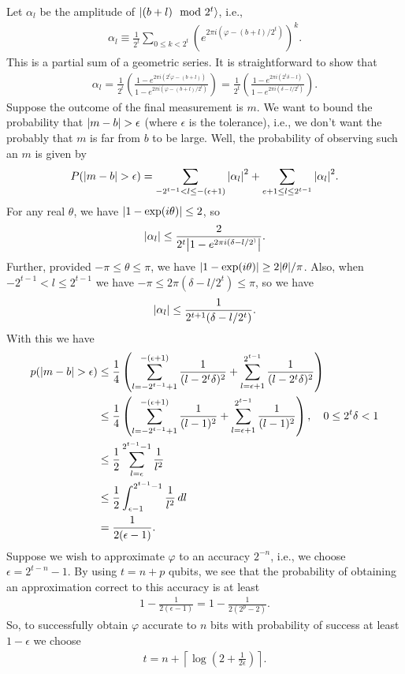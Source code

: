 \documentclass{book}
\theoremstyle{definition}
\newcommand{\nn}{\nonumber}
\newcommand{\al}{\alpha}
\newcommand{\f}[2]{\frac{#1}{#2}}
\newcommand{\lp}{\left(}
\newcommand{\rp}{\right)}
\begin{document}
Let $\al_l$ be the amplitude of $\ket{(b+l) \mod 2^t}$, i.e., 
\begin{align}
\alpha_l \equiv \f{1}{2^t}\sum_{0 \leq k < 2^t} \lp e^{2\pi i (\varphi - (b+l)/2^t)} \rp^k.
\end{align}
This is a partial sum of a geometric series. It is straightforward to show that
\begin{align}
\alpha_l = \f{1}{2^t}\lp \f{1 - e^{2\pi i (2^t \varphi - (b+l))}}{1 - e^{2\pi i (\varphi - (b+l)/2^t)}} \rp = \f{1}{2^t}\lp \f{1 - e^{2\pi i (2^t \delta - l)}}{1 - e^{2\pi i (\delta - l/2^t)}} \rp.
\end{align}
Suppose the outcome of the final measurement is $m$. We want to bound the probability that $\abs{m-b} > \epsilon$ (where $\epsilon$ is the tolerance), i.e., we don't want the probably that $m$ is far from $b$ to be large. Well, the probability of observing such an $m$ is given by
\begin{align}
P(\abs{m-b} > \epsilon) = \sum_{-2^{t-1} < l \leq -(\epsilon+1)} \abs{\al_l}^2 + \sum_{e+1 \leq l \leq 2^{t-1}}\abs{\al_l}^2.
\end{align}
For any real $\theta$, we have $\abs{1 - \exp(i\theta)} \leq 2$, so 
\begin{align}
\abs{\al_l} \leq \f{2}{2^t \abs{1 - e^{2\pi i (\delta - l/2^)}}}.
\end{align}
Further, provided $-\pi \leq \theta \leq \pi$, we have $\abs{1 - \exp(i\theta)} \geq 2\abs{\theta}/\pi$. Also, when $-2^{t-1} < l \leq 2^{t-1}$ we have $-\pi \leq 2\pi (\delta - l/2^t) \leq \pi$, so we have
\begin{align}
\abs{\al_l} \leq \f{1}{2^{t+1}(\delta - l/2^t)}.
\end{align}
With this we have
\begin{align}
p(\abs{m-b} > \epsilon) &\leq \f{1}{4}\lp \sum_{l = -2^{t-1}+1}^{-(\epsilon+1)} \f{1}{(l - 2^t \delta)^2} + \sum^{2^{t-1}}_{l = \epsilon+1} \f{1}{(l - 2^t \delta)^2}  \rp\nn\\
&\leq \f{1}{4}\lp \sum_{l = -2^{t-1}+1}^{-(\epsilon+1)} \f{1}{(l - 1)^2} + \sum^{2^{t-1}}_{l = \epsilon+1} \f{1}{(l - 1)^2}   \rp, \quad 0 \leq 2^t\delta < 1\nn\\
&\leq \f{1}{2}\sum^{2^{t-1}-1}_{l=\epsilon} \f{1}{l^2}\nn\\
&\leq \f{1}{2}\int^{2^{t-1}-1}_{\epsilon-1} \f{1}{l^2}\,dl\nn\\
&= \f{1}{2(\epsilon-1)}.
\end{align}
Suppose we wish to approximate $\varphi$ to an accuracy $2^{-n}$, i.e., we choose $\epsilon = 2^{t-n}-1$. By using $t =n+p$ qubits, we see that the probability of obtaining an approximation correct to this accuracy is at least 
\begin{align}
1-\f{1}{2(\epsilon-1)} = 1 - \f{1}{2(2^p - 2)}.
\end{align}
So, to successfully obtain $\varphi$ accurate to $n$ bits with probability of success at least $1-\epsilon$ we choose 
\begin{align}
t = n + \left\lceil \log \lp 2 + \f{1}{2\epsilon} \rp \right\rceil.
\end{align}
\end{document}
